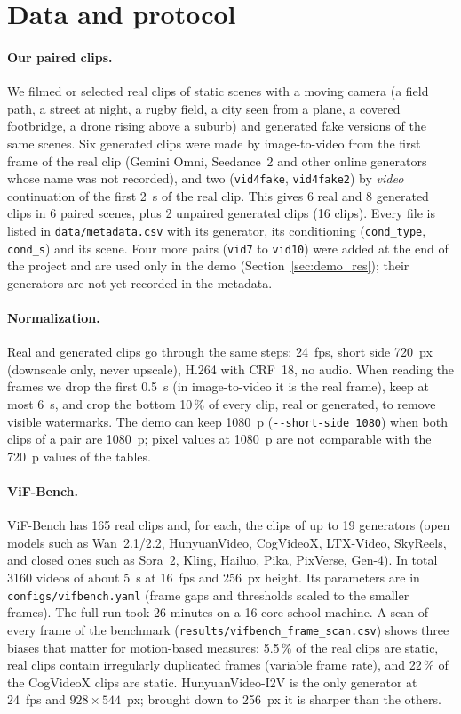 \documentclass[11pt,a4paper]{article}
\begin{document}
\section{Data and protocol}

\paragraph{Our paired clips.}
We filmed or selected real clips of static scenes with a moving camera (a field path, a
street at night, a rugby field, a city seen from a plane, a covered footbridge, a drone
rising above a suburb) and generated fake versions of the same scenes. Six generated clips
were made by image-to-video from the first frame of the real clip (Gemini Omni, Seedance~2
and other online generators whose name was not recorded), and two (\texttt{vid4fake},
\texttt{vid4fake2}) by \emph{video} continuation of the first 2~s of the real clip. This
gives 6 real and 8 generated clips in 6 paired scenes, plus 2 unpaired generated clips
(16 clips). Every file is listed in
\texttt{data/metadata.csv} with its generator, its conditioning (\texttt{cond\_type},
\texttt{cond\_s}) and its scene. Four more pairs (\texttt{vid7} to \texttt{vid10}) were added
at the end of the project and are used only in the demo (Section~\ref{sec:demo_res}); their
generators are not yet recorded in the metadata.

\paragraph{Normalization.}
Real and generated clips go through the same steps: 24~fps, short side 720~px (downscale
only, never upscale), H.264 with CRF~18, no audio. When reading the frames we drop the first
0.5~s (in image-to-video it is the real frame), keep at most 6~s, and crop the bottom 10\,\%
of every clip, real or generated, to remove visible watermarks. The demo can keep 1080~p
(\texttt{-{}-short-side 1080}) when both clips of a pair are 1080~p; pixel values at 1080~p are
not comparable with the 720~p values of the tables.

\paragraph{ViF-Bench.}
ViF-Bench \cite{vifbench} has 165 real clips and, for each, the clips of up to 19 generators
(open models such as Wan~2.1/2.2, HunyuanVideo, CogVideoX, LTX-Video, SkyReels, and closed
ones such as Sora~2, Kling, Hailuo, Pika, PixVerse, Gen-4). In total 3160 videos of about
5~s at 16~fps and 256~px height. Its parameters are in \texttt{configs/vifbench.yaml} (frame
gaps and thresholds scaled to the smaller frames). The full run took 26 minutes on a
16-core school machine. A scan of every frame of the benchmark
(\texttt{results/vifbench\_frame\_scan.csv}) shows three biases that matter for motion-based
measures: 5.5\,\% of the real clips are static, real clips contain irregularly duplicated
frames (variable frame rate), and 22\,\% of the CogVideoX clips are static. HunyuanVideo-I2V is
the only generator at 24~fps and $928\times544$~px; brought down to 256~px it is sharper than
the others.
\end{document}
